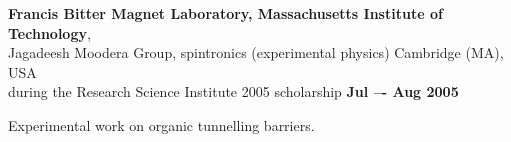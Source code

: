 \documentclass[margin,line]{resume}
\begin{document}
\begin{resume}
    {\bf Francis Bitter Magnet Laboratory, Massachusetts Institute of Technology},\\
    Jagadeesh Moodera Group, spintronics (experimental physics) \hfill Cambridge (MA), USA\\
    during the Research Science Institute 2005 scholarship \hfill {\bf Jul –- Aug 2005}\\
    \begin{list2}
        \vspace*{-4mm}
        \item Experimental work on organic tunnelling barriers.
    \end{list2}

\vspace{3mm}



\end{resume}
\end{document}

